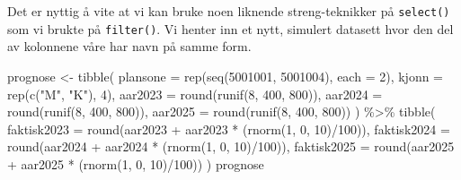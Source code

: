 \documentclass[
  letterpaper,
  DIV=11,
  numbers=noendperiod]{scrreprt}
\newenvironment{Shaded}{\begin{snugshade}}{\end{snugshade}}
\newcommand{\AttributeTok}[1]{\textcolor[rgb]{0.40,0.45,0.13}{#1}}
\newcommand{\DecValTok}[1]{\textcolor[rgb]{0.68,0.00,0.00}{#1}}
\newcommand{\FunctionTok}[1]{\textcolor[rgb]{0.28,0.35,0.67}{#1}}
\newcommand{\NormalTok}[1]{\textcolor[rgb]{0.00,0.23,0.31}{#1}}
\newcommand{\OtherTok}[1]{\textcolor[rgb]{0.00,0.23,0.31}{#1}}
\newcommand{\SpecialCharTok}[1]{\textcolor[rgb]{0.37,0.37,0.37}{#1}}
\newcommand{\StringTok}[1]{\textcolor[rgb]{0.13,0.47,0.30}{#1}}
\begin{document}
Det er nyttig å vite at vi kan bruke noen liknende streng-teknikker på
\texttt{select()} som vi brukte på \texttt{filter()}. Vi henter inn et
nytt, simulert datasett hvor den del av kolonnene våre har navn på samme
form.

\begin{Shaded}
\begin{Highlighting}[]
\NormalTok{prognose }\OtherTok{\textless{}{-}} \FunctionTok{tibble}\NormalTok{(}
  \AttributeTok{plansone =} \FunctionTok{rep}\NormalTok{(}\FunctionTok{seq}\NormalTok{(}\DecValTok{5001001}\NormalTok{, }\DecValTok{5001004}\NormalTok{), }\AttributeTok{each =} \DecValTok{2}\NormalTok{),}
  \AttributeTok{kjonn =} \FunctionTok{rep}\NormalTok{(}\FunctionTok{c}\NormalTok{(}\StringTok{"M"}\NormalTok{, }\StringTok{"K"}\NormalTok{), }\DecValTok{4}\NormalTok{),}
  \AttributeTok{aar2023 =} \FunctionTok{round}\NormalTok{(}\FunctionTok{runif}\NormalTok{(}\DecValTok{8}\NormalTok{, }\DecValTok{400}\NormalTok{, }\DecValTok{800}\NormalTok{)),}
  \AttributeTok{aar2024 =} \FunctionTok{round}\NormalTok{(}\FunctionTok{runif}\NormalTok{(}\DecValTok{8}\NormalTok{, }\DecValTok{400}\NormalTok{, }\DecValTok{800}\NormalTok{)),}
  \AttributeTok{aar2025 =} \FunctionTok{round}\NormalTok{(}\FunctionTok{runif}\NormalTok{(}\DecValTok{8}\NormalTok{, }\DecValTok{400}\NormalTok{, }\DecValTok{800}\NormalTok{))}
\NormalTok{) }\SpecialCharTok{\%\textgreater{}\%} 
  \FunctionTok{tibble}\NormalTok{(}
    \AttributeTok{faktisk2023 =} \FunctionTok{round}\NormalTok{(aar2023 }\SpecialCharTok{+}\NormalTok{ aar2023 }\SpecialCharTok{*}\NormalTok{ (}\FunctionTok{rnorm}\NormalTok{(}\DecValTok{1}\NormalTok{, }\DecValTok{0}\NormalTok{, }\DecValTok{10}\NormalTok{)}\SpecialCharTok{/}\DecValTok{100}\NormalTok{)),}
    \AttributeTok{faktisk2024 =} \FunctionTok{round}\NormalTok{(aar2024 }\SpecialCharTok{+}\NormalTok{ aar2024 }\SpecialCharTok{*}\NormalTok{ (}\FunctionTok{rnorm}\NormalTok{(}\DecValTok{1}\NormalTok{, }\DecValTok{0}\NormalTok{, }\DecValTok{10}\NormalTok{)}\SpecialCharTok{/}\DecValTok{100}\NormalTok{)),}
    \AttributeTok{faktisk2025 =} \FunctionTok{round}\NormalTok{(aar2025 }\SpecialCharTok{+}\NormalTok{ aar2025 }\SpecialCharTok{*}\NormalTok{ (}\FunctionTok{rnorm}\NormalTok{(}\DecValTok{1}\NormalTok{, }\DecValTok{0}\NormalTok{, }\DecValTok{10}\NormalTok{)}\SpecialCharTok{/}\DecValTok{100}\NormalTok{))}
\NormalTok{  )}
\NormalTok{prognose}
\end{Highlighting}
\end{Shaded}
\end{document}
